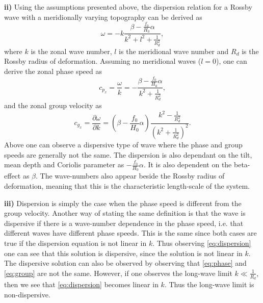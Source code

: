 \textbf{ii)} Using the assumptions presented above, the dispersion relation for a Rossby wave with a meridionally varying topography can be derived as 
\begin{equation}
    \omega = -k\frac{\beta-\frac{f_0}{H_0}{\alpha}}{k^2+l^2+\frac{1}{R_d^2}},
    \label{eq:dispersion}
\end{equation}
where $k$ is the zonal wave number, $l$ is the meridional wave number and $R_d$ is the Rossby radius of deformation. Assuming no meridional waves ($l=0$), one can derive the zonal phase speed as 
\begin{equation}
    c_{p_x} = \frac{\omega}{k}=-\frac{\beta-\frac{f_0}{H_0}{\alpha}}{k^2+\frac{1}{R_d^2}},
    \label{eq:phase}
\end{equation}
and the zonal group velocity as 
\begin{equation}
    c_{g_x} = \frac{\partial \omega}{\partial k}=\left(\beta-\frac{f_0}{H_0}{\alpha}\right)\frac{k^2-\frac{1}{R_d^2}}{\left(k^2+\frac{1}{R_d^2}\right)^2}.
    \label{eq:group}
\end{equation}
Above one can observe a dispersive type of wave where the phase and group speeds are generally not the same. The dispersion is also dependant on the tilt, mean depth and Coriolis parameter as $-\tfrac{f_0}{H_0}{\alpha}$. It is also dependent on the beta-effect as $\beta$. The wave-numbers also appear beside the Rossby radius of deformation, meaning that this is the characteristic length-scale of the system. 

\textbf{iii)} Dispersion is simply the case when the phase speed is different from the group velocity. Another way of stating the same definition is that the wave is dispersive if there is a wave-number dependence in the phase speed, i.e. that different waves have different phase speeds. This is the same since both cases are true if the dispersion equation is not linear in $k$. Thus observing \autoref{eq:dispersion} one can see that this solution is dispersive, since the solution is not linear in $k$. The dispersive solution can also be observed by observing that \autoref{eq:phase} and \autoref{eq:group} are not the same. However, if one observes the long-wave limit $k\ll\tfrac{1}{R_d}$, then we see that \autoref{eq:dispersion} becomes linear in $k$. Thus the long-wave limit is non-dispersive. 

